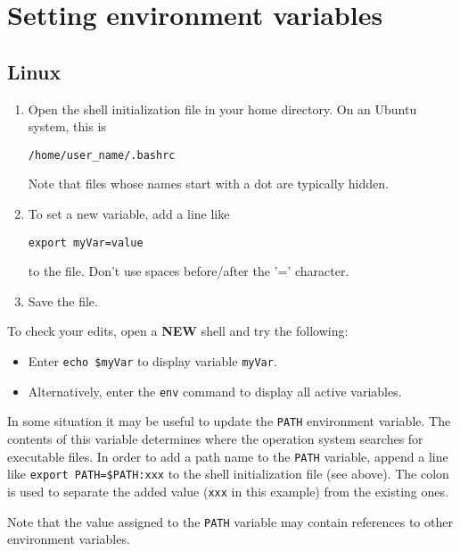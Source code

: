 
\chapter{Setting environment variables} \label{chap:appendix:envVars}
\renewcommand{\tabdir}{appendix/envVars/envVars/tab}
\renewcommand{\figdir}{appendix/envVars/envVars/fig}

\section{Linux} \label{sec:appendix:envVars:linux}

\begin{enumerate}
  \item Open the shell initialization file in your home directory. On an Ubuntu system, this is \par \hspace{5mm} \verb!/home/user_name/.bashrc! \par Note that files whose names start with a dot are typically hidden.
  \item To set a new variable, add a line like \par \hspace{5mm} \verb!export myVar=value! \par to the file. Don't use spaces before/after the '=' character.
  \item Save the file.
\end{enumerate}

To check your edits, open a \textbf{NEW} shell and try the following:
\begin{itemize}
  \item Enter \verb!echo $myVar! to display variable \verb!myVar!.
  \item Alternatively, enter the \verb!env! command to display all active variables.
\end{itemize}

In some situation it may be useful to update the \verb!PATH! environment variable. The contents of this variable determines where the operation system searches for executable files. In order to add a path name to the \verb!PATH! variable, append a line like \verb!export PATH=$PATH:xxx! to the shell initialization file (see above). The colon is used to separate the added value (\verb!xxx! in this example) from the existing ones.

Note that the value assigned to the \verb!PATH! variable may contain references to other environment variables.


